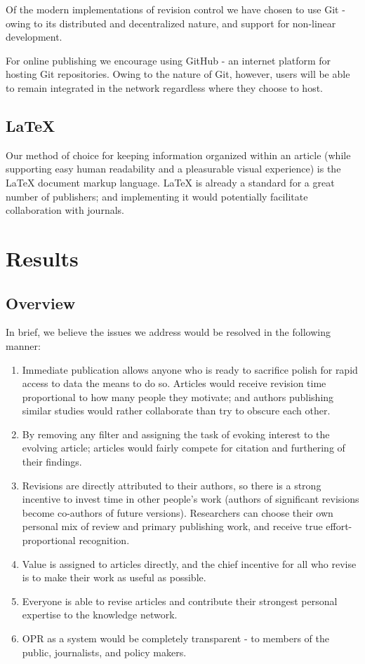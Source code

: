 Of the modern implementations of revision control we have chosen to use Git\cite{git} - owing to its distributed and decentralized nature, and support for non-linear development. 

For online publishing we encourage using GitHub\cite{github} - an internet platform for hosting Git repositories.
Owing to the nature of Git, however, users will be able to remain integrated in the network regardless where they choose to host.
\subsection{LaTeX}
Our method of choice for keeping information organized within an article (while supporting easy human readability and a pleasurable visual experience) is the LaTeX\cite{latex} document markup language.
LaTeX is already a standard for a great number of publishers;
and implementing it would potentially facilitate collaboration with journals.

\section{Results}
\subsection{Overview}
In brief, we believe the issues we address would be resolved in the following manner:
\begin{enumerate}
	\item Immediate publication allows anyone who is ready to sacrifice polish for rapid access to data the means to do so.
	Articles would receive revision time proportional to how many people they motivate; and authors publishing similar studies would rather collaborate than try to obscure each other.
	\item By removing any filter and assigning the task of evoking interest to the evolving article;
	articles would fairly compete for citation and furthering of their findings.
	\item Revisions are directly attributed to their authors, so there is a strong incentive to invest time in other people's work
	(authors of significant revisions become co-authors of future versions). 
	Researchers can choose their own personal mix of review and primary publishing work, and receive true effort-proportional recognition. 
	\item Value is assigned to articles directly, and the chief incentive for all who revise is to make their work as useful as possible.
	\item Everyone is able to revise articles and contribute their strongest personal expertise to the knowledge network.
	\item OPR as a system would be completely transparent - to members of the public, journalists, and policy makers. 
\end{enumerate}
